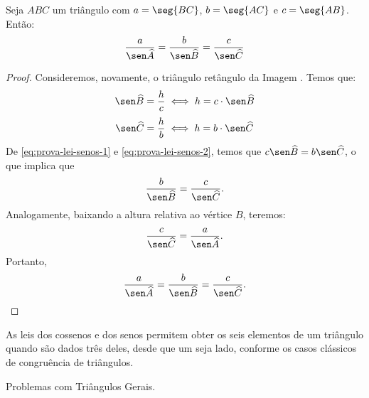 \begin{theorem}
    Seja $ABC$ um triângulo com $a = \seg {BC}$, $b = \seg {AC}$ e $c = \seg
{AB}$. Então:
$$\frac a {\sen \widehat A} = \frac b {\sen \widehat B} = \frac c {\sen \widehat C}$$
\end{theorem}

\begin{proof}
    Consideremos, novamente, o triângulo retângulo da Imagem . %
    Temos que:
    \begin{equation}
    \label{eq:prova-lei-senos-1}
        \sen \widehat B = \frac h c \iff h = c \cdot \sen \widehat B
    \end{equation}
    \begin{equation}
    \label{eq:prova-lei-senos-2}
        \sen \widehat C = \frac h b \iff h = b \cdot \sen \widehat C
    \end{equation}
    De \ref{eq:prova-lei-senos-1} e \ref{eq:prova-lei-senos-2}, temos que $c \sen \widehat B = b \sen \widehat C$,
    o que implica que $$\frac b {\sen \widehat B} = \frac c {\sen \widehat C}.$$ Analogamente, 
    baixando a altura relativa ao vértice $B$, teremos: $$ \frac c {\sen \widehat C} = \frac a {\sen \widehat A}.$$
    Portanto, $$\frac a {\sen \widehat A} = \frac b {\sen \widehat B} = \frac c {\sen \widehat C}.$$
\end{proof}

As leis dos cossenos e dos senos permitem obter os seis elementos de
um triângulo quando são dados três deles, desde que um seja lado,
conforme os casos clássicos de congruência de triângulos.

\begin{onlineact}
    {Problemas com Triângulos Gerais}.
\end{onlineact}